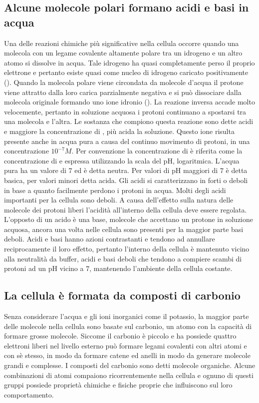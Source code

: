 \subsection{Alcune molecole polari formano acidi e basi in acqua}
Una delle reazioni chimiche pi\`u significative nella cellula occorre quando una molecola con un legame covalente altamente polare tra un idrogeno e un altro atomo si dissolve in acqua.
Tale idrogeno ha quasi completamente perso il proprio elettrone e pertanto esiste quasi come nucleo di idrogeno caricato positivamente (). Quando la molecola polare viene 
circondata da molecole d'acqua il protone viene attratto dalla loro carica parzialmente negativa e si pu\`o dissociare dalla molecola originale formando uno ione idronio (). La 
reazione inversa accade molto velocemente, pertanto in soluzione acquosa i protoni continuano a spostarsi tra una molecola e l'altra. Le sostanza che compiono questa reazione sono dette 
acidi e maggiore la concentrazione di , pi\`u acida la soluzione. Questo ione risulta presente anche in acqua pura a causa del continuo movimento di protoni, in una 
concentrazione $10^{-7} M$. Per convenzione la concentrazione di  \`e riferita come la concentrazione di  e espressa utilizzando la scala del pH, logaritmica. L'acqua 
pura ha un valore di $7$ ed \`e detta neutra. Per valori di pH maggiori di $7$ \`e detta basica, per valori minori detta acida. Gli acidi si caratterizzano in forti o deboli in base a 
quanto facilmente perdono i protoni in acqua. Molti degli acidi importanti per la cellula sono deboli. A causa dell'effetto sulla natura delle molecole dei protoni liberi l'acidit\`a 
all'interno della cellula deve essere regolata. L'opposto di un acido \`e una base, molecole che accettano un protone in soluzione acquosa, ancora una volta nelle cellula sono presenti 
per la maggior parte basi deboli. Acidi e basi hanno azioni contrastanti e tendono ad annullare reciprocamente il loro effetto, pertanto l'interno della cellula \`e mantenuto vicino 
alla neutralit\`a da buffer, acidi e basi deboli che tendono a compiere scambi di protoni ad un pH vicino a $7$, mantenendo l'ambiente della cellula costante. 
\subsection{La cellula \`e formata da composti di carbonio}
Senza considerare l'acqua e gli ioni inorganici come il potassio, la maggior parte delle molecole nella cellula sono basate sul carbonio, un atomo con la capacit\`a di formare grosse
molecole. Siccome il carbonio \`e piccolo e ha possiede quattro elettroni liberi nel livello esterno pu\`o formare legami covalenti con altri atomi e con s\`e stesso, in modo da formare
catene ed anelli in modo da generare molecole grandi e complesse. I composti del carbonio sono detti molecole organiche. Alcune combinazioni di atomi compaiono ricorrentemente nella
cellula e ognuno di questi gruppi possiede propriet\`a chimiche e fisiche proprie che influiscono sul loro comportamento. 
